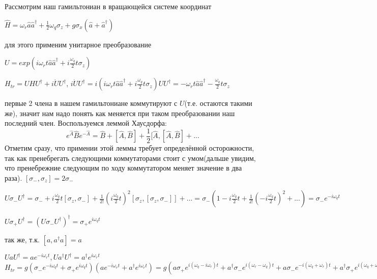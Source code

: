 \documentclass[12pt, twoside]{report}
\begin{document}
Рассмотрим наш гамильтониан в вращающейся системе координат
\begin{center}

$\hat{H}=\omega_r\hat{a}\hat{a}^{\dagger}+\frac{1}{2}\omega_q\sigma_z+
g\sigma_x(\hat{a}+\hat{a}^{\dagger})$

\end{center}
для этого применим унитарное преобразование
\begin{center}
 $U=exp(i\omega_rt\hat{a}\hat{a}^{\dagger}+i\frac{\omega_q}{2}t\sigma_z)$
\end{center}
\begin{center}
$H_{tr}=UHU^{\dagger}+i\dot{U}U^{\dagger}$,
$i\dot{U}U^{\dagger}=i(i\omega_rt\hat{a}\hat{a}^{\dagger}+i\frac{\omega_q}{2}t\sigma_z)UU^{\dagger}=-\omega_rt\hat{a}\hat{a}^{\dagger}-\frac{\omega_q}{2}t\sigma_z$
\end{center}
первые 2 члена в нашем гамильтониане коммутируют с $U$(т.е. остаются такими же), значит нам надо понять как меняется при таком преобразовании наш последний член.
Воспользуемся леммой Хаусдорфа:
\begin{equation}
e^{\hat{A}} \hat{B} e^{-\hat{A}} = \hat{B}+[\hat{A},\hat{B}]+\frac{1}{2}[\hat{A},[\hat{A},\hat{B}]+...
\label{eq:Hausdorf}
\end{equation}
Отметим сразу, что примении этой леммы требует определённой осторожности, так как пренебрегать следующими коммутаторами стоит с умом(дальше увидим, что пренебрежние следующим по ходу коммутатором меняет значение в два раза).
$[\sigma_-,\sigma_z]=2\sigma_-$
\begin{center}
$U\sigma_-U^{\dagger}=\sigma_- +
i\frac{\omega_q}{2}t[\sigma_z,\sigma_-]+
\frac{1}{2!}(i\frac{\omega_q}{2}t)^2[\sigma_z,[\sigma_z,\sigma_-]]+...
=\sigma_-(1- i\frac{\omega_q}{2}t+\frac{1}{2!}(-i\frac{\omega_q}{2}t)^2+...)=\sigma_-e^{-i\omega_qt}$
\end{center}
\newpage
\begin{center}
$U\sigma_+U^{\dagger}=(U\sigma_-U^{\dagger})^{\dagger}=
\sigma_+e^{i\omega_qt}$
\end{center} 
так же, т.к. $[a,a^{\dagger}a]=a$
\begin{center}
$UaU^{\dagger}=ae^{-i\omega_rt},
Ua^{\dagger}U^{\dagger}=a^{\dagger} e^{i\omega_rt}$\\
$H_{tr}=g(\sigma_-e^{-i\omega_qt}+\sigma_+e^{i\omega_qt})
(ae^{-i\omega_rt}+a^{\dagger}e^{i\omega_rt}) =
g(a\sigma_+e^{i(\omega_q-i\omega_r)t}+
a^{\dagger}\sigma_-e^{i(\omega_r-\omega_q)t}+
a\sigma_-e^{-i(\omega_q+\omega_r)t}+
a^{\dagger}\sigma_+e^{i(\omega_q+\omega_r)t})$
\end{center}
\end{document}
